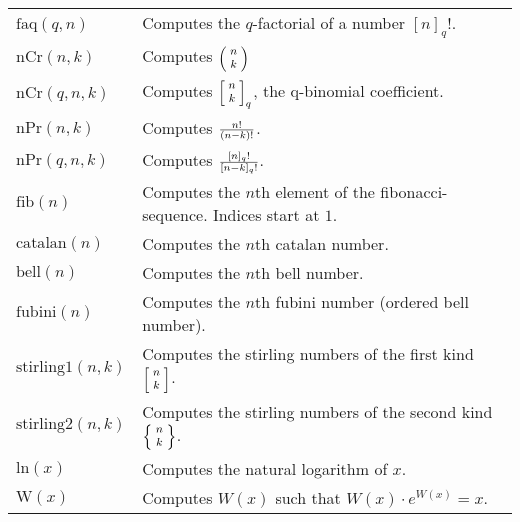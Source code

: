 \documentclass[10pt]{article}
\newcommand{\tabgap}{\vspace{3mm}\\}
\begin{document}
\begin{longtable}{p{}p{}}
        $ \mathrm{faq}(q, n) $                     & Computes the $ q $-factorial of a number $ [n]_q! $. \\
        $ \mathrm{nCr}(n, k) $                     & Computes $ \footnotesize\Bigl(\kern-2\nulldelimiterspace\begin{array}{c}n\\k\end{array}\kern-2\nulldelimiterspace\Bigr) $ \\
        $ \mathrm{nCr}(q, n, k) $                  & Computes $ \footnotesize\Bigl[\kern-2\nulldelimiterspace\begin{array}{c}n\\k\end{array}\kern-2\nulldelimiterspace\Bigr]_q $, the q-binomial coefficient. \\
        $ \mathrm{nPr}(n, k) $                     & Computes $ \footnotesize\frac{n!}{(n-k)!} $. \\
        $ \mathrm{nPr}(q, n, k) $                  & Computes $ \footnotesize\frac{[n]_q!}{[n-k]_q!} $. \\
        $ \mathrm{fib}(n) $                        & Computes the $ n $th element of the fibonacci-sequence. Indices start at $ 1 $. \tabgap
        $ \mathrm{catalan}(n) $                    & Computes the $ n $th catalan number. \\
        $ \mathrm{bell}(n) $                       & Computes the $ n $th bell number. \\
        $ \mathrm{fubini}(n) $                     & Computes the $ n $th fubini number (ordered bell number). \\
        $ \mathrm{stirling1}(n, k) $               & Computes the stirling numbers of the first kind $ \footnotesize\Bigl[\kern-2\nulldelimiterspace\begin{array}{c}n\\k\end{array}\kern-2\nulldelimiterspace\Bigr] $. \\
        $ \mathrm{stirling2}(n, k) $               & Computes the stirling numbers of the second kind $ \footnotesize\Bigl\{\kern-2\nulldelimiterspace\begin{array}{c}n\\k\end{array}\kern-2\nulldelimiterspace\Bigr\} $. \tabgap
        $ \mathrm{ln}(x) $                         & Computes the natural logarithm of $ x $. \\
        $ \mathrm{W}(x) $                          & Computes $ W(x) $ such that $ W(x) \cdot e^{W(x)} = x $. \\

\end{longtable}
\end{document}
